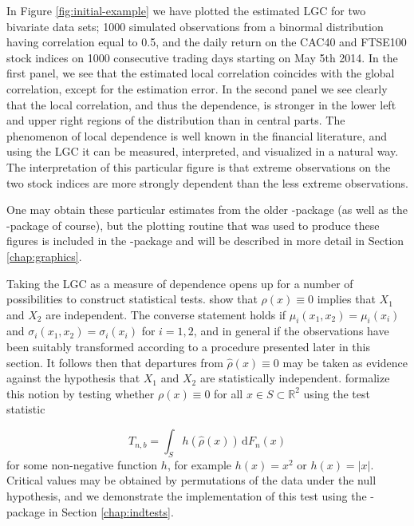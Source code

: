 In Figure \ref{fig:initial-example} we have plotted the estimated LGC for two bivariate data sets; 1000 simulated observations from a binormal distribution having correlation equal to 0.5, and the daily return on the CAC40 and FTSE100 stock indices on 1000 consecutive trading days starting on May 5th 2014. In the first panel, we see that the estimated local correlation coincides with the global correlation, except for the estimation error. In the second panel we see clearly that the local correlation, and thus the dependence, is stronger in the lower left and upper right regions of the distribution than in central parts. The phenomenon of local dependence is well known in the financial literature, and using the LGC it can be measured, interpreted, and visualized in a natural way. The interpretation of this particular figure is that extreme observations on the two stock indices are more strongly dependent than the less extreme observations. 

One may obtain these particular estimates from the older -package (as well as the -package of course), but the plotting routine that was used to produce these figures is included in the -package and will be described in more detail in Section \ref{chap:graphics}.

Taking the LGC as a measure of dependence opens up for a number of possibilities to construct statistical tests. \citet{bere:tjos:2014} show that $\rho(x) \equiv 0$ implies that $X_1$ and $X_2$ are independent. The converse statement holds if $\mu_i(x_1, x_2) = \mu_i(x_i)$ and $\sigma_i(x_1, x_2) = \sigma_i(x_i)$ for $i=1,2$, and in general if the observations have been suitably transformed according to a procedure presented later in this section. It follows then that departures from $\widehat\rho(x) \equiv 0$ may be taken as evidence against the hypothesis that $X_1$ and $X_2$ are statistically independent. \citet{bere:tjos:2014} formalize this notion by testing whether $\rho(x) \equiv 0$ for all $x\in S \subset \mathbb{R}^2$ using the test statistic

\begin{equation}
T_{n,b} = \int_S h\left(\widehat \rho(x) \right) \,\textrm{d}F_n(x)
\label{eq:test-statistic1}
\end{equation}
for some non-negative function $h$, for example $h(x) = x^2$ or $h(x) = |x|$. Critical values may be obtained by permutations of the data under the null hypothesis, and we demonstrate the implementation of this test using the -package in Section \ref{chap:indtests}.

